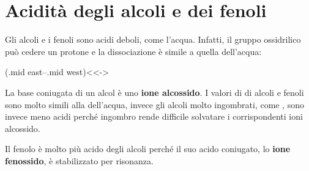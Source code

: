 \section{Acidità degli alcoli e dei fenoli}\label{sec:aciditaAlcol}
Gli alcoli e i fenoli sono acidi deboli, come l'acqua. Infatti, il gruppo ossidrilico può cedere un protone e la dissociazione è simile a quella dell'acqua:

\begingroup
\chemnameinit{}
\begin{reaction}
	 \arrow(.mid east--.mid west){<<->}
	 \+{1em,1em} 
\end{reaction}
\chemnameinit{}
\endgroup

La base coniugata di un alcol è uno \textbf{ione alcossido}. I valori di \pKa di alcoli e fenoli sono molto simili alla \pKa dell'acqua, invece gli alcoli molto ingombrati, come , sono invece meno acidi perché ingombro rende difficile solvatare i corrispondenti ioni alcossido.

Il fenolo è molto più acido degli alcoli perché il suo acido coniugato, lo \textbf{ione fenossido}, è stabilizzato per risonanza.


